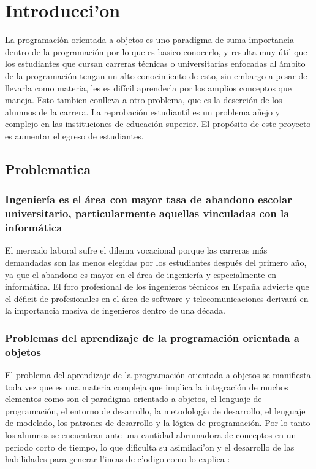 \chapter{Introducci'on}
La programación orientada a objetos es uno paradigma de suma importancia dentro de la programación por lo que es basico conocerlo, y resulta muy útil que los estudiantes que cursan carreras técnicas o universitarias enfocadas al ámbito de la programación tengan un alto conocimiento de esto, sin embargo a pesar de llevarla como materia, les es difícil aprenderla por los amplios conceptos que maneja. Esto tambien conlleva a otro problema, que es la deserción de los alumnos de la carrera. La reprobación estudiantil es un problema añejo y complejo en las instituciones de educación superior. El propósito de este proyecto es aumentar el egreso de estudiantes.

\section{Problematica}
\subsection{Ingeniería es el área con mayor tasa de abandono escolar universitario, particularmente aquellas vinculadas con la informática}
El mercado laboral sufre el dilema vocacional porque las carreras más demandadas son las menos elegidas por los estudiantes después del primero año, ya que el abandono es mayor en el área de ingeniería y especialmente en informática. El foro profesional de los ingenieros técnicos en España advierte que el déficit de profesionales en el área de software y telecomunicaciones derivará en la importancia masiva de ingenieros dentro de una década.

\subsection{Problemas del aprendizaje de la programación orientada a objetos}
El problema del aprendizaje de la programación orientada a objetos se manifiesta toda vez que es una materia compleja que implica la integración de muchos elementos como son el paradigma orientado a objetos, el lenguaje de programación, el entorno de desarrollo, la metodología de desarrollo, el lenguaje de modelado, los patrones de desarrollo y la lógica de programación. Por lo tanto los alumnos se encuentran ante una cantidad abrumadora de conceptos en un periodo corto de tiempo, lo que dificulta su asimilaci'on y el desarrollo de las habilidades para generar l'ineas de c'odigo como lo explica \cite{spigariol2013ensenando}:

